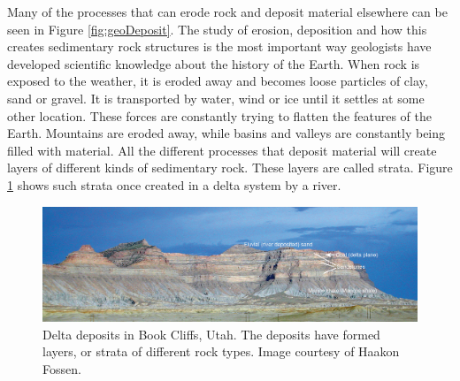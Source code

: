\documentclass[a4paper,12pt]{report}
\begin{document}
Many of the processes that can erode rock and deposit material elsewhere can be seen in Figure \ref{fig:geoDeposit}. The study of erosion, deposition and how this creates sedimentary rock structures is the most important way geologists have developed scientific knowledge about the history of the Earth. When rock is exposed to the weather, it is eroded away and becomes loose particles of clay, sand or gravel. It is transported by water, wind or ice until it settles at some other location. These forces are constantly trying to flatten the features of the Earth. Mountains are eroded away, while basins and valleys are constantly being filled with material. All the different processes that deposit material will create layers of different kinds of sedimentary rock. These layers are called strata. Figure \ref{fig:strata} shows such strata once created in a delta system by a river.


\begin{figure}
 \includegraphics[width=\linewidth]{thesis/geo/english/strata.jpg}
 \caption{Delta deposits in Book Cliffs, Utah. The deposits have formed layers, or strata of different rock types. Image courtesy of Haakon Fossen.}
 \label{fig:strata}
\end{figure}
\end{document}
